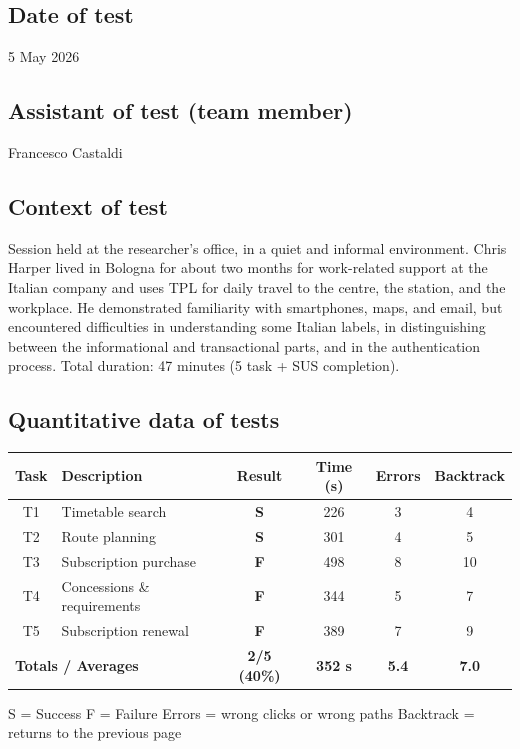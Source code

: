 ﻿\documentclass[11pt,a4paper]{article}
\begin{document}
\subsection*{Date of test}
\begin{tcolorbox}[base]
5 May 2026
\end{tcolorbox}

\subsection*{Assistant of test (team member)}
\begin{tcolorbox}[base]
Francesco Castaldi
\end{tcolorbox}

\subsection*{Context of test}
\begin{tcolorbox}[base]
Session held at the researcher's office, in a quiet and informal environment. Chris Harper lived in Bologna for about two months for work-related support at the Italian company and uses TPL for daily travel to the centre, the station, and the workplace. He demonstrated familiarity with smartphones, maps, and email, but encountered difficulties in understanding some Italian labels, in distinguishing between the informational and transactional parts, and in the authentication process. Total duration: 47 minutes (5 task + SUS completion).
\end{tcolorbox}

\subsection*{Quantitative data of tests}
\begin{tcolorbox}[base]
\begin{center}
\renewcommand{\arraystretch}{1.4}
\begin{tabular}{clcccc}
\toprule
\textbf{Task} & \textbf{Description} &
\textbf{Result} & \textbf{Time (s)} &
\textbf{Errors} & \textbf{Backtrack} \\
\midrule
T1 & Timetable search          & \textbf{S} & 226 & 3 & 4 \\
T2 & Route planning            & \textbf{S} & 301 & 4 & 5 \\
T3 & Subscription purchase     & \textbf{F} & 498 & 8 & 10 \\
T4 & Concessions \& requirements & \textbf{F} & 344 & 5 & 7 \\
T5 & Subscription renewal      & \textbf{F} & 389 & 7 & 9 \\
\midrule
\multicolumn{2}{l}{\textbf{Totals / Averages}} &
\textbf{2/5 (40\%)} & \textbf{352 s} &
\textbf{5.4} & \textbf{7.0} \\
\bottomrule
\end{tabular}
\end{center}
\vspace{0.3cm}
\small S = Success \quad F = Failure \quad
Errors = wrong clicks or wrong paths \quad
Backtrack = returns to the previous page
\end{tcolorbox}
\end{document}
